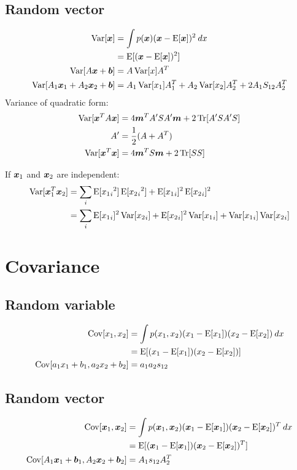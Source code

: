 \documentclass[a4paper]{article}
\begin{document}
\subsection{Random vector}
\begin{align*}
  \Var{\bs{x}} &= \int p(\bs{x}) (\bs{x}-\Exp{\bs{x}})^2 \: dx \\
               &= \Exp{(\bs{x}-\Exp{\bs{x}})^2} \\
  \Var{A \bs{x} + \bs{b}} &= A \Var{x} A^T \\
  \Var{A_1 \bs{x}_1 + A_2 \bs{x}_2 + \bs{b}} &= A_1 \Var{x_1} A_1^T + A_2 \Var{x_2} A_2^T + 2 A_1 S_{12} A_2^T \\
\end{align*}
Variance of quadratic form:
\begin{align*}
  \Var{\bs{x}^T A \bs{x}} &= 4 \bs{m}^T A' S A' \bs{m} + 2 \Tr{A' S A' S} \\
  A' &= \frac{1}{2} (A + A^T) \\
  \Var{\bs{x}^T \bs{x}} &= 4 \bs{m}^T S \bs{m} + 2 \Tr{S S} \\
\end{align*}

If $\bs{x}_1$ and $\bs{x}_2$ are independent:
\begin{align*}
  \Var{\bs{x}_1^T \bs{x}_2} &= \sum_i \Exp{{{x_1}_i}^2} \Exp{{{x_2}_i}^2} + \Exp{{x_1}_i}^2 \Exp{{x_2}_i}^2 \\
                            &= \sum_i \Exp{{x_1}_i}^2 \Var{{x_2}_i} + \Exp{{x_2}_i}^2 \Var{{x_1}_i} + \Var{{x_1}_i} \Var{{x_2}_i}
\end{align*}

\newpage
\section{Covariance}
\subsection{Random variable}
\begin{align*}
  \Cov{x_1, x_2} &= \int p(x_1, x_2) (x_1-\Exp{x_1}) (x_2-\Exp{x_2}) \: dx \\
                 &= \Exp{(x_1-\Exp{x_1})(x_2-\Exp{x_2})} \\
  \Cov{a_1 x_1 + b_1, a_2 x_2 + b_2} &= a_1 a_2 s_{12} \\
\end{align*}

\subsection{Random vector}
\begin{align*}
  \Cov{\bs{x}_1, \bs{x}_2} &= \int p(\bs{x}_1, \bs{x}_2) (\bs{x}_1-\Exp{\bs{x}_1}) (\bs{x}_2-\Exp{\bs{x}_2})^T \: dx \\
                           &= \Exp{(\bs{x}_1-\Exp{\bs{x}_1})(\bs{x}_2-\Exp{\bs{x}_2})^T} \\
  \Cov{A_1 \bs{x}_1 + \bs{b}_1, A_2 \bs{x}_2 + \bs{b}_2} &= A_1 s_{12} A_2^T \\
\end{align*}
\end{document}
